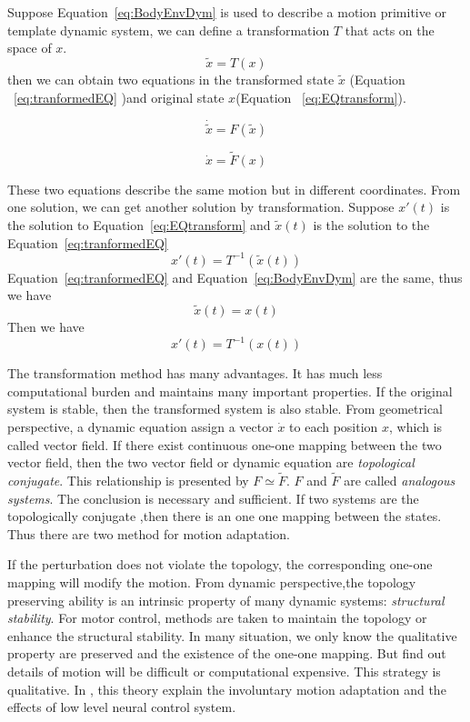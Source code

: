Suppose Equation~\ref{eq:BodyEnvDym} is used to describe a motion primitive or template dynamic system,
 we can define a transformation $T$ that acts on the space of $x$.
\[
\tilde{x}=T(x)
\]
then we can obtain two equations in  the transformed state $\tilde{x}$ (Equation ~\ref{eq:tranformedEQ} )and original state $x$(Equation ~\ref{eq:EQtransform}).

\begin{equation}
\dot{\tilde{x}}=F(\tilde{x})
\label{eq:tranformedEQ}
\end{equation}

\begin{equation}
\dot{x}=\tilde{F}(x)
\label{eq:EQtransform}
\end{equation}

These two equations describe the same motion but in different coordinates.
From one solution, we can get another solution by transformation.
Suppose $x'(t)$ is the solution to Equation~\ref{eq:EQtransform} and $\tilde{x}(t)$ is the solution to the Equation~\ref{eq:tranformedEQ}
\[
x'(t)=T^{-1}(\tilde{x}(t))
\]
Equation~\ref{eq:tranformedEQ} and Equation~\ref{eq:BodyEnvDym} are the same, thus we have
\[
\tilde{x}(t)=x(t)
\]
Then we have
\[
x'(t)=T^{-1}(x(t))
\]




%
%
The  transformation method has many advantages.
It has much less computational burden and maintains many important properties.
If the original system is stable, then the transformed system is also stable.
%
%
From geometrical perspective, a dynamic equation assign a vector $\dot{x}$ to each position $x$, which is called vector field.
If there exist continuous one-one mapping between the two vector field, then the two vector field  or dynamic equation are \emph{topological conjugate}.
This relationship is presented by $F \simeq \tilde{F}$.
$F$ and $\tilde{F}$ are called \emph{analogous systems}.
The conclusion is necessary and sufficient.
If two systems are the topologically conjugate ,then there is an one one mapping between the states.
Thus there are two method for motion adaptation.

If the perturbation does not violate the topology, the corresponding one-one mapping will modify the motion.
From dynamic perspective,the topology preserving ability is an intrinsic property of many dynamic systems:
\emph{structural stability}.
For motor control, methods are taken to maintain the topology or enhance the structural stability.
In many situation, we only know the qualitative property are preserved and the existence of the one-one mapping.
But find out details of motion will be difficult or computational expensive.
This strategy is qualitative.
In \moit, this theory explain the involuntary motion adaptation and the effects of low level neural control system.

